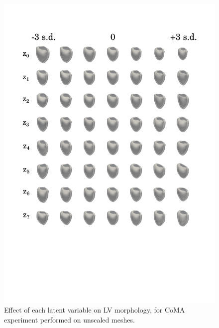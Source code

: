 \begin{figure}
\includegraphics[width=\textwidth]{figs/supplementary/experiment_2_synthetic_meshes}
\caption{Effect of each latent variable on LV morphology, for CoMA experiment performed on unscaled meshes.}
\label{fig:experiment_2_synthetic_meshes}
\end{figure}

